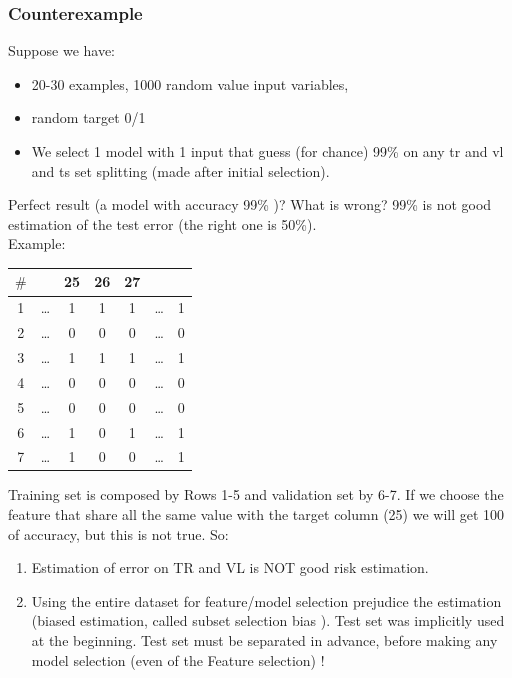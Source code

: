\documentclass[../main.tex]{subfiles}
\begin{document}
\subsubsection{Counterexample}
Suppose we have:
\begin{itemize}
    \item 20-30 examples, 1000 random value input variables,
    \item random target 0/1
    \item We select 1 model with 1 input that guess (for chance) 99\% on any tr and vl and ts set splitting (made after initial selection).
\end{itemize}
\begin{center}
Perfect result (a model with accuracy 99\% )? What is wrong? 99\% is not good estimation of the test error (the right one is 50\%).\\

Example:
\begin{tabular}{ |c||c|c|c|c|c|c| } 
 \hline
 $\#$  &      & 25 &26 & 27& &   \\
   \hline\hline
 1 &\dots & 1 & 1 & 1 & \dots & 1 \\ 
 2 &\dots & 0 & 0 & 0 & \dots & 0 \\ 
 3 &\dots & 1 & 1 & 1 & \dots & 1 \\ 
 4 &\dots & 0 & 0 & 0 & \dots & 0 \\ 
 5 &\dots & 0 & 0 & 0 & \dots & 0 \\ 
  \hline\hline
 6 &\dots & 1 & 0 & 1 & \dots & 1 \\ 
 7 &\dots & 1 & 0 & 0 & \dots & 1 \\ 
 \hline
\end{tabular}
\end{center}
Training set is composed by Rows 1-5 and validation set by 6-7. If we choose the feature that share all the same value with the target column (25) we will get 100 of accuracy, but this is not true. So:
\begin{enumerate}
    \item Estimation of error on TR and VL is NOT good risk estimation.
    \item Using the entire dataset for feature/model selection prejudice the
estimation (biased estimation, called subset selection bias ). Test set was implicitly used at the beginning. Test set must be separated in advance, before making any model selection (even of the Feature selection) !
\end{enumerate}
\end{document}

